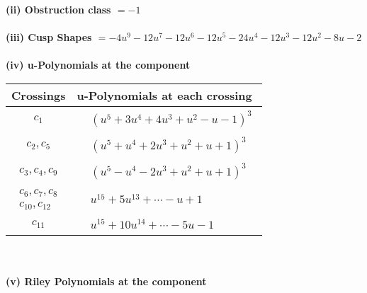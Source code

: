 \documentclass[1p]{elsarticle_modified}
\theoremstyle{definition}
\begin{document}
\flushleft \textbf{(ii) Obstruction class $= -1$}\\~\\
\flushleft \textbf{(iii) Cusp Shapes $= -4 u^9-12 u^7-12 u^6-12 u^5-24 u^4-12 u^3-12 u^2-8 u-2$}\\~\\
\newpage\renewcommand{\arraystretch}{1}
\flushleft \textbf{(iv) u-Polynomials at the component}\newline \\
\begin{tabular}{m{50pt}|m{274pt}}
Crossings & \hspace{64pt}u-Polynomials at each crossing \\
\hline $$\begin{aligned}c_{1}\end{aligned}$$&$\begin{aligned}
&(u^5+3 u^4+4 u^3+u^2- u-1)^3
\end{aligned}$\\
\hline $$\begin{aligned}c_{2},c_{5}\end{aligned}$$&$\begin{aligned}
&(u^5+u^4+2 u^3+u^2+u+1)^3
\end{aligned}$\\
\hline $$\begin{aligned}c_{3},c_{4},c_{9}\end{aligned}$$&$\begin{aligned}
&(u^5- u^4-2 u^3+u^2+u+1)^3
\end{aligned}$\\
\hline $$\begin{aligned}c_{6},c_{7},c_{8}\\c_{10},c_{12}\end{aligned}$$&$\begin{aligned}
&u^{15}+5 u^{13}+\cdots- u+1
\end{aligned}$\\
\hline $$\begin{aligned}c_{11}\end{aligned}$$&$\begin{aligned}
&u^{15}+10 u^{14}+\cdots-5 u-1
\end{aligned}$\\
\hline
\end{tabular}\\~\\
\newpage\renewcommand{\arraystretch}{1}
\flushleft \textbf{(v) Riley Polynomials at the component}\newline \\
\end{document}
